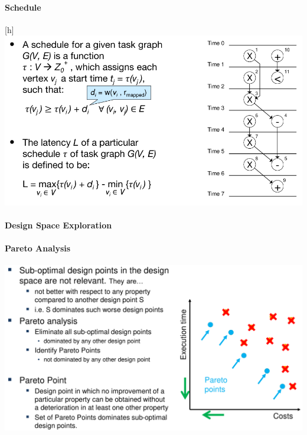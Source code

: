 \documentclass[english]{latex4ei/latex4ei_sheet}
\begin{document}
\paragraph{Schedule}

\begin{center}[h]
  \includegraphics[width=\linewidth]{assets/Schedule.png}
  \label{fig:schedule}
\end{center}

\paragraph{Design Space Exploration}

\paragraph{Pareto Analysis}

\begin{center}
  \centering
  \includegraphics[width=\linewidth]{assets/ParetoSlide.png}
  \label{fig:paretoslide}
\end{center}
\end{document}
